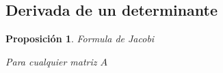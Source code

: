 \documentclass[12pt, twoside]{book}\usepackage[]{graphicx}\usepackage[]{color}
\numberwithin{equation}{section}
\numberwithin{theorem}{section}
\newtheorem{teorema}{Proposición}
\newenvironment{teo}
      {\begin{shaded}\begin{teorema}}
      {\end{teorema}\end{shaded}}
\numberwithin{teorema}{section}
\numberwithin{defi}{section}
\numberwithin{prop}{section}
\numberwithin{defi}{section}
\theoremstyle{plain}
\begin{document}
\subsection{Derivada de un determinante}

\begin{teo}{Formula de Jacobi}

Para cualquier matriz $A$

\end{teo}
\end{document}
